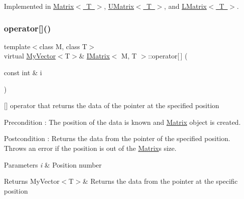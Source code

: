 Implemented in \mbox{\hyperlink{class_matrix_a33c00fb6f2e9401d17d9ed615b965634}{Matrix$<$ T $>$}}, \mbox{\hyperlink{class_u_matrix_a3f12f4544a460dd93dac8a883654310f}{U\+Matrix$<$ T $>$}}, and \mbox{\hyperlink{class_l_matrix_ad4feb8e3706e9ce8fdb07e63d985f52f}{L\+Matrix$<$ T $>$}}.

\mbox{\label{class_i_matrix_a3cfb2490e2849c6c19c1979066a64818}} 
\subsubsection{\texorpdfstring{operator[]()}{operator[]()}\hspace{0.1cm}{\footnotesize\ttfamily [1/2]}}
{\footnotesize\ttfamily template$<$class M, class T$>$ \\
virtual \mbox{\hyperlink{class_my_vector}{My\+Vector}}$<$T$>$\& \mbox{\hyperlink{class_i_matrix}{I\+Matrix}}$<$ M, T $>$\+::operator\mbox{[}$\,$\mbox{]} (\begin{DoxyParamCaption}\item[{const int \&}]{i }\end{DoxyParamCaption})\hspace{0.3cm}{\ttfamily [pure virtual]}}



\mbox{[}\mbox{]} operator that returns the data of the pointer at the specified position 

\begin{DoxyPrecond}{Precondition}
\+: The position of the data is known and \mbox{\hyperlink{class_matrix}{Matrix}} object is created. 
\end{DoxyPrecond}
\begin{DoxyPostcond}{Postcondition}
\+: Returns the data from the pointer of the specified position. Throws an error if the position is out of the \mbox{\hyperlink{class_matrix}{Matrix}}\textquotesingle{}s size. 
\end{DoxyPostcond}

\begin{DoxyParams}{Parameters}
{\em i} & Position number \\
\hline
\end{DoxyParams}
\begin{DoxyReturn}{Returns}
My\+Vector$<$\+T$>$\& Returns the data from the pointer at the specific position 
\end{DoxyReturn}



